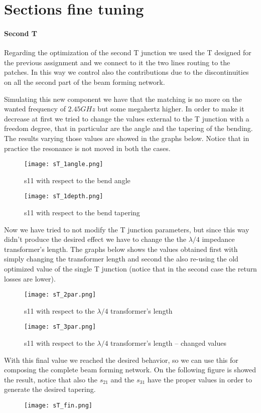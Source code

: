 \section{Sections fine tuning}

\paragraph{Second T}
Regarding the optimization of the second T junction we used the T designed for the previous assignment and we connect to it the two lines routing to the patches. In this way we control also the contributions due to the discontinuities on all the second part of the beam forming network.

Simulating this new component we have that the matching is no more on the wanted frequency of $2.45GHz$ but some megahertz higher. In order to make it decrease at first we tried to change the values external to the T junction with a freedom degree, that in particular are the angle and the tapering of the bending. The results varying those values are showed in the graphs below. Notice that in practice the resonance is not moved in both the cases.
\begin{figure}[H]
	\centering
	\texttt{[image: sT\_1angle.png]}
	\caption{s11 with respect to the bend angle}
	\label{sT_1angle}
\end{figure}
\begin{figure}[H]
	\centering
	\texttt{[image: sT\_1depth.png]}
	\caption{s11 with respect to the bend tapering}
	\label{sT_1depth}
\end{figure}
Now we have tried to not modify the T junction parameters, but since this way didn't produce the desired effect we have to change the the $\lambda/4$ impedance transformer's length. The graphs below shows the values obtained first with simply changing the transformer length and second the also re-using the old optimized value of the single T junction (notice that in the second case the return losses are lower).
\begin{figure}[H]
	\centering
	\texttt{[image: sT\_2par.png]}
	\caption{s11 with respect to the $\lambda/4$ transformer's length}
	\label{sT_2par}
\end{figure}
\begin{figure}[H]
	\centering
	\texttt{[image: sT\_3par.png]}
	\caption{s11 with respect to the $\lambda/4$ transformer's length -- changed values}
	\label{sT_3par}
\end{figure}
With this final value we reached the desired behavior, so we can use this for composing the complete beam forming network. On the following figure is showed the result, notice that also the $s_{21}$ and the $s_{31}$ have the proper values in order to generate the desired tapering.
\begin{figure}[H]
	\centering
	\texttt{[image: sT\_fin.png]}
	\caption{}
	\label{sT_fin}
\end{figure}
